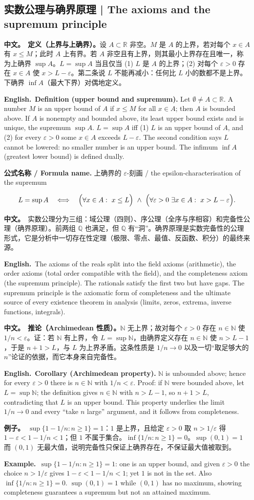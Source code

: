 \documentclass[UTF8,11pt,a4paper]{ctexart}
\newcommand{\R}{\mathbb{R}}
\newcommand{\N}{\mathbb{N}}
\newcommand{\Q}{\mathbb{Q}}
\newcommand{\BOTH}[2]{\par\noindent\textbf{中文。}\ #1\par\noindent\textbf{English.}\ #2\par}
\newcommand{\EX}[2]{\par\noindent\textbf{例子。}\ #1\par\noindent\textbf{Example.}\ #2\par}
\newcommand{\FORMULA}[2]{\par\noindent\textbf{公式名称 / Formula name.} #1 / #2\par}
\begin{document}
\subsection{实数公理与确界原理 | The axioms and the supremum principle}
\BOTH{\textbf{定义（上界与上确界）。}设 $A\subset\R$ 非空。$M$ 是 $A$ 的上界，若对每个 $x\in A$ 有 $x\le M$；此时 $A$ 上有界。若 $A$ 非空且有上界，则其最小上界存在且唯一，称为上确界 $\sup A$。$L=\sup A$ 当且仅当 (1) $L$ 是 $A$ 的上界；(2) 对每个 $\varepsilon>0$ 存在 $x\in A$ 使 $x>L-\varepsilon$。第二条说 $L$ 不能再减小：任何比 $L$ 小的数都不是上界。下确界 $\inf A$（最大下界）对偶地定义。}{\textbf{Definition (upper bound and supremum).} Let $\emptyset\ne A\subset\R$. A number $M$ is an upper bound of $A$ if $x\le M$ for all $x\in A$; then $A$ is bounded above. If $A$ is nonempty and bounded above, its least upper bound exists and is unique, the supremum $\sup A$. $L=\sup A$ iff (1) $L$ is an upper bound of $A$, and (2) for every $\varepsilon>0$ some $x\in A$ exceeds $L-\varepsilon$. The second condition says $L$ cannot be lowered: no smaller number is an upper bound. The infimum $\inf A$ (greatest lower bound) is defined dually.}
\FORMULA{上确界的 $\varepsilon$-刻画}{the epsilon-characterisation of the supremum}
\[
L=\sup A\quad\Longleftrightarrow\quad
\Bigl(\forall x\in A:\ x\le L\Bigr)\ \wedge\
\Bigl(\forall \varepsilon>0\ \exists x\in A:\ x>L-\varepsilon\Bigr).
\]
\BOTH{实数公理分为三组：域公理（四则）、序公理（全序与序相容）和完备性公理（确界原理）。前两组 $\Q$ 也满足，但 $\Q$ 有“洞”。确界原理是实数完备性的公理形式，它是分析中一切存在性定理（极限、零点、最值、反函数、积分）的最终来源。}{The axioms of the reals split into the field axioms (arithmetic), the order axioms (total order compatible with the field), and the completeness axiom (the supremum principle). The rationals satisfy the first two but have gaps. The supremum principle is the axiomatic form of completeness and the ultimate source of every existence theorem in analysis (limits, zeros, extrema, inverse functions, integrals).}
\BOTH{\textbf{推论（Archimedean 性质）。}$\N$ 无上界；故对每个 $\varepsilon>0$ 存在 $n\in\N$ 使 $1/n<\varepsilon$。证：若 $\N$ 有上界，令 $L=\sup\N$，由确界定义存在 $n\in\N$ 使 $n>L-1$，于是 $n+1>L$，与 $L$ 为上界矛盾。这条性质是 $1/n\to0$ 以及一切“取足够大的 $n$”论证的依据，而它本身来自完备性。}{\textbf{Corollary (Archimedean property).} $\N$ is unbounded above; hence for every $\varepsilon>0$ there is $n\in\N$ with $1/n<\varepsilon$. Proof: if $\N$ were bounded above, let $L=\sup\N$; the definition gives $n\in\N$ with $n>L-1$, so $n+1>L$, contradicting that $L$ is an upper bound. This property underlies the limit $1/n\to0$ and every “take $n$ large” argument, and it follows from completeness.}
\EX{$\sup\{1-1/n:n\ge1\}=1$：$1$ 是上界，且给定 $\varepsilon>0$ 取 $n>1/\varepsilon$ 得 $1-\varepsilon<1-1/n<1$；但 $1$ 不属于集合。$\inf\{1/n:n\ge1\}=0$。$\sup(0,1)=1$ 而 $(0,1)$ 无最大值，说明完备性只保证上确界存在，不保证最大值被取到。}{$\sup\{1-1/n:n\ge1\}=1$: one is an upper bound, and given $\varepsilon>0$ the choice $n>1/\varepsilon$ gives $1-\varepsilon<1-1/n<1$; yet $1$ is not in the set. Also $\inf\{1/n:n\ge1\}=0$. $\sup(0,1)=1$ while $(0,1)$ has no maximum, showing completeness guarantees a supremum but not an attained maximum.}
\end{document}
